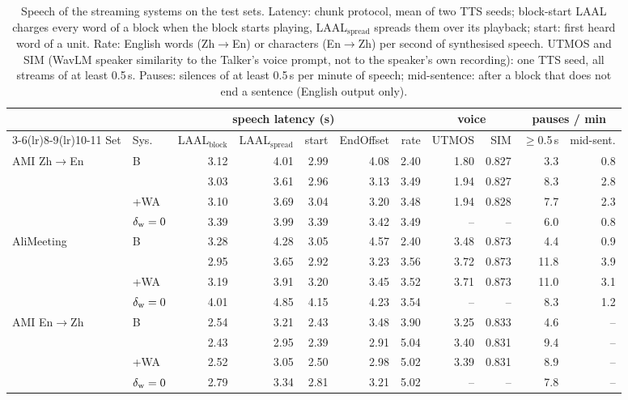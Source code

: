 \begin{table}[t]
\centering\small
\setlength{\tabcolsep}{3.5pt}
\begin{tabular}{llrrrrrrrrr}
\toprule
 & & \multicolumn{4}{c}{speech latency (s)} & & \multicolumn{2}{c}{voice} & \multicolumn{2}{c}{pauses / min} \\
\cmidrule(lr){3-6}\cmidrule(lr){8-9}\cmidrule(lr){10-11}
Set & Sys. & LAAL$_\text{block}$ & LAAL$_\text{spread}$ & start & EndOffset & rate & UTMOS & SIM & $\ge$0.5\,s & mid-sent. \\
\midrule
AMI Zh$\rightarrow$En & B & 3.12 & 4.01 & 2.99 & 4.08 & 2.40 & 1.80 & 0.827 & 3.3 & 0.8 \\
 & \sys{} & 3.03 & 3.61 & 2.96 & 3.13 & 3.49 & 1.94 & 0.827 & 8.3 & 2.8 \\
 & \sys{}+WA & 3.10 & 3.69 & 3.04 & 3.20 & 3.48 & 1.94 & 0.828 & 7.7 & 2.3 \\
 & $\delta_{\mathrm{w}}=0$ & 3.39 & 3.99 & 3.39 & 3.42 & 3.49 & -- & -- & 6.0 & 0.8 \\
\midrule
AliMeeting & B & 3.28 & 4.28 & 3.05 & 4.57 & 2.40 & 3.48 & 0.873 & 4.4 & 0.9 \\
 & \sys{} & 2.95 & 3.65 & 2.92 & 3.23 & 3.56 & 3.72 & 0.873 & 11.8 & 3.9 \\
 & \sys{}+WA & 3.19 & 3.91 & 3.20 & 3.45 & 3.52 & 3.71 & 0.873 & 11.0 & 3.1 \\
 & $\delta_{\mathrm{w}}=0$ & 4.01 & 4.85 & 4.15 & 4.23 & 3.54 & -- & -- & 8.3 & 1.2 \\
\midrule
AMI En$\rightarrow$Zh & B & 2.54 & 3.21 & 2.43 & 3.48 & 3.90 & 3.25 & 0.833 & 4.6 & -- \\
 & \sys{} & 2.43 & 2.95 & 2.39 & 2.91 & 5.04 & 3.40 & 0.831 & 9.4 & -- \\
 & \sys{}+WA & 2.52 & 3.05 & 2.50 & 2.98 & 5.02 & 3.39 & 0.831 & 8.9 & -- \\
 & $\delta_{\mathrm{w}}=0$ & 2.79 & 3.34 & 2.81 & 3.21 & 5.02 & -- & -- & 7.8 & -- \\
\bottomrule
\end{tabular}
\caption{Speech of the streaming systems on the test sets. Latency: chunk protocol, mean of two TTS seeds; block-start LAAL charges every word of a block when the block starts playing, LAAL$_\text{spread}$ spreads them over its playback; start: first heard word of a unit. Rate: English words (Zh$\rightarrow$En) or characters (En$\rightarrow$Zh) per second of synthesised speech. UTMOS and SIM (WavLM speaker similarity to the Talker's voice prompt, not to the speaker's own recording): one TTS seed, all streams of at least 0.5\,s. Pauses: silences of at least 0.5\,s per minute of speech; mid-sentence: after a block that does not end a sentence (English output only).}
\label{tab:postreview}
\end{table}

